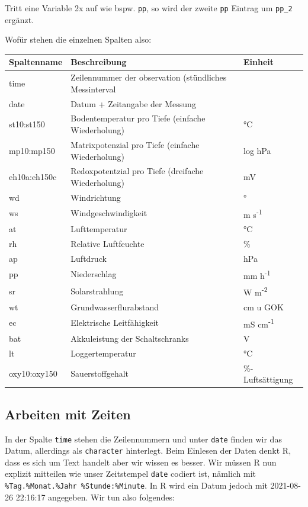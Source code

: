 \documentclass[
]{article}
\begin{document}
Tritt eine Variable 2x auf wie bspw. \texttt{pp}, so wird der zweite \texttt{pp} Eintrag um \texttt{pp\_2} ergänzt.

Wofür stehen die einzelnen Spalten also:

\begin{longtable}[]{@{}lll@{}}
\toprule
Spaltenname & Beschreibung & Einheit \\
\midrule
\endhead
time & Zeilennummer der observation (stündliches Messinterval & \\
date & Datum + Zeitangabe der Messung & \\
st10:st150 & Bodentemperatur pro Tiefe (einfache Wiederholung) & °C \\
mp10:mp150 & Matrixpotenzial pro Tiefe (einfache Wiederholung) & log hPa \\
eh10a:eh150c & Redoxpotentzial pro Tiefe (dreifache Wiederholung) & mV \\
wd & Windrichtung & ° \\
ws & Windgeschwindigkeit & m s\textsuperscript{-1} \\
at & Lufttemperatur & °C \\
rh & Relative Luftfeuchte & \% \\
ap & Luftdruck & hPa \\
pp & Niederschlag & mm h\textsuperscript{-1} \\
sr & Solarstrahlung & W m\textsuperscript{-2} \\
wt & Grundwasserflurabstand & cm u GOK \\
ec & Elektrische Leitfähigkeit & mS cm\textsuperscript{-1} \\
bat & Akkuleistung der Schaltschranks & V \\
lt & Loggertemperatur & °C \\
oxy10:oxy150 & Sauerstoffgehalt & \%-Luftsättigung \\
\bottomrule
\end{longtable}

\hypertarget{arbeiten-mit-zeiten}{%
\subsection{Arbeiten mit Zeiten}\label{arbeiten-mit-zeiten}}

In der Spalte \texttt{time} stehen die Zeilennummern und unter \texttt{date} finden wir das Datum, allerdings als \texttt{character} hinterlegt. Beim Einlesen der Daten denkt R, dass es sich um Text handelt aber wir wissen es besser. Wir müssen R nun explizit mitteilen wie unser Zeitstempel \texttt{date} codiert ist, nämlich mit \texttt{\%Tag.\%Monat.\%Jahr\ \%Stunde:\%Minute}. In R wird ein Datum jedoch mit 2021-08-26 22:16:17 angegeben. Wir tun also folgendes:
\end{document}
